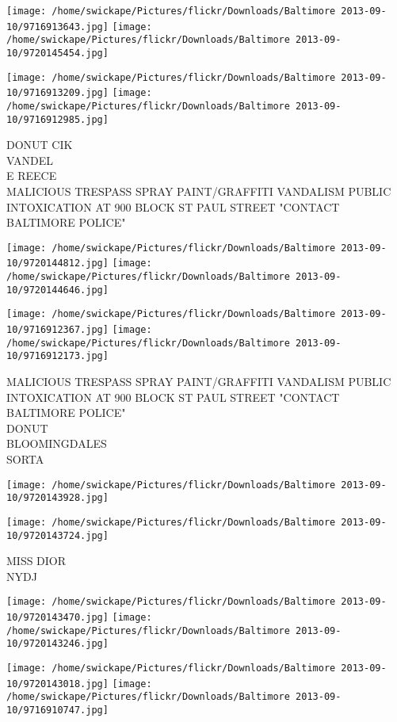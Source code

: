 \documentclass[10pt,letterpaper]{article}
\begin{document}
\texttt{[image: /home/swickape/Pictures/flickr/Downloads/Baltimore 2013-09-10/9716913643.jpg]}
\texttt{[image: /home/swickape/Pictures/flickr/Downloads/Baltimore 2013-09-10/9720145454.jpg]}

\texttt{[image: /home/swickape/Pictures/flickr/Downloads/Baltimore 2013-09-10/9716913209.jpg]}
\texttt{[image: /home/swickape/Pictures/flickr/Downloads/Baltimore 2013-09-10/9716912985.jpg]}

DONUT CIK\\
VANDEL\\
E REECE\\
MALICIOUS TRESPASS SPRAY PAINT/GRAFFITI VANDALISM PUBLIC INTOXICATION AT 900 BLOCK ST PAUL STREET "CONTACT BALTIMORE POLICE"\\
\pagebreak

\texttt{[image: /home/swickape/Pictures/flickr/Downloads/Baltimore 2013-09-10/9720144812.jpg]}
\texttt{[image: /home/swickape/Pictures/flickr/Downloads/Baltimore 2013-09-10/9720144646.jpg]}

\texttt{[image: /home/swickape/Pictures/flickr/Downloads/Baltimore 2013-09-10/9716912367.jpg]}
\texttt{[image: /home/swickape/Pictures/flickr/Downloads/Baltimore 2013-09-10/9716912173.jpg]}

MALICIOUS TRESPASS SPRAY PAINT/GRAFFITI VANDALISM PUBLIC INTOXICATION AT 900 BLOCK ST PAUL STREET "CONTACT BALTIMORE POLICE"\\
DONUT\\
BLOOMINGDALES\\
SORTA\\
\pagebreak

\texttt{[image: /home/swickape/Pictures/flickr/Downloads/Baltimore 2013-09-10/9720143928.jpg]}

\vspace{0.25in}
\texttt{[image: /home/swickape/Pictures/flickr/Downloads/Baltimore 2013-09-10/9720143724.jpg]}

MISS DIOR\\
NYDJ\\
\pagebreak

\texttt{[image: /home/swickape/Pictures/flickr/Downloads/Baltimore 2013-09-10/9720143470.jpg]}
\texttt{[image: /home/swickape/Pictures/flickr/Downloads/Baltimore 2013-09-10/9720143246.jpg]}

\texttt{[image: /home/swickape/Pictures/flickr/Downloads/Baltimore 2013-09-10/9720143018.jpg]}
\texttt{[image: /home/swickape/Pictures/flickr/Downloads/Baltimore 2013-09-10/9716910747.jpg]}
\end{document}
